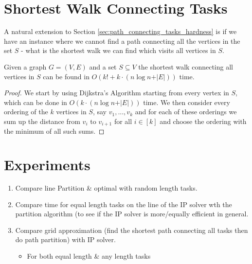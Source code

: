 \documentclass{DAC}
\begin{document}

\section{Shortest Walk Connecting Tasks}
A natural extension  to Section \ref{sec:path_connecting_tasks_hardness} is if we have an instance where we cannot find a path connecting all the vertices in the set $S$ - what is the shortest walk we can find which visits all vertices in $S$.
\begin{lemma}
Given a graph $G=(V,E)$ and a set $S \subseteq V$ the shortest walk connecting all vertices in $S$ can be found in $O(k! + k \cdot( n\log n  +\vert E \vert ))$ time.
\end{lemma}
\begin{proof}
We start by using Dijkstra's Algorithm starting from every vertex in $S$, which can be done in $O(k \cdot( n\log n  +\vert E \vert ))$ time. We then consider every ordering of the $k$ vertices in $S$, say $v_1,...,v_k$ and for each of these orderings we sum up the distance from $v_i$ to $v_{i+1}$ for all $i \in [k]$ and choose the ordering with the minimum of all such sums.
\end{proof}
\section{Experiments}

\begin{enumerate}
    \item Compare line Partition \& optimal with random length tasks.
    \item Compare time for equal length tasks on the line of the IP solver wth the partition algorithm (to see if the IP solver is more/equally efficient in general.
    \item Compare grid approximation (find the shortest path connecting all tasks then do path partition) with IP solver.
    \begin{itemize}
        \item For both equal length \& any length tasks
    \end{itemize}
\end{enumerate}

\printbibliography
\end{document}
